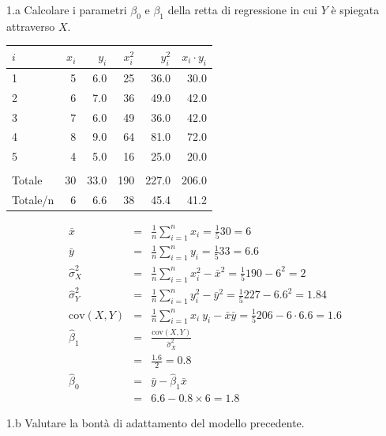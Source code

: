 \documentclass[
  11pt,
]{book}
\theoremstyle{mytheoremstyle}
\theoremstyle{mydefstyle}
\newenvironment{sol}
  {
  \begin{tcolorbox}[enhanced,breakable,arc=0.1mm,boxrule=1pt,colback=white,colframe=iblue,
  title=\bf \fontfamily{lmss}\selectfont \hspace{.5 cm} Soluzione,drop fuzzy shadow]

}{
\end{tcolorbox}
  }
\begin{document}
1.a Calcolare i parametri \(\beta_{0}\) e \(\beta_{1}\) della retta
di regressione in cui \(Y\) è spiegata attraverso \(X\).

\begin{sol}

\begin{table}[H]
\centering
\begin{tabular}{lrrrrr}
\toprule
$i$ & $x_i$ & $y_i$ & $x_i^2$ & $y_i^2$ & $x_i\cdot y_i$\\
\midrule
1 & 5 & 6.0 & 25 & 36.0 & 30.0\\
2 & 6 & 7.0 & 36 & 49.0 & 42.0\\
3 & 7 & 6.0 & 49 & 36.0 & 42.0\\
4 & 8 & 9.0 & 64 & 81.0 & 72.0\\
5 & 4 & 5.0 & 16 & 25.0 & 20.0\\
\midrule\\
Totale & 30 & 33.0 & 190 & 227.0 & 206.0\\
Totale/n & 6 & 6.6 & 38 & 45.4 & 41.2\\
\bottomrule
\end{tabular}
\end{table}

\begin{eqnarray*}
           \bar x &=&\frac 1 n\sum_{i=1}^n x_i = \frac {1}{ 5 }  30 =  6 \\
           \bar y &=&\frac 1 n\sum_{i=1}^n y_i = \frac {1}{ 5 }  33 =  6.6 \\
           \hat\sigma_X^2&=&\frac 1 n\sum_{i=1}^n x_i^2-\bar x^2=\frac {1}{ 5 }  190  - 6 ^2= 2 \\
           \hat\sigma_Y^2&=&\frac 1 n\sum_{i=1}^n y_i^2-\bar y^2=\frac {1}{ 5 }  227  - 6.6 ^2= 1.84 \\
           \text{cov}(X,Y)&=&\frac 1 n\sum_{i=1}^n x_i~y_i-\bar x\bar y=\frac {1}{ 5 }  206 - 6 \cdot 6.6 = 1.6 \\
           \hat\beta_1 &=& \frac{\text{cov}(X,Y)}{\hat\sigma_X^2} \\
                    &=& \frac{ 1.6 }{ 2 }  =  0.8 \\
           \hat\beta_0 &=& \bar y - \hat\beta_1 \bar x\\
                    &=&  6.6 - 0.8 \times  6 = 1.8 
         \end{eqnarray*}

\end{sol}

1.b Valutare la bontà di adattamento del modello precedente.
\end{document}
